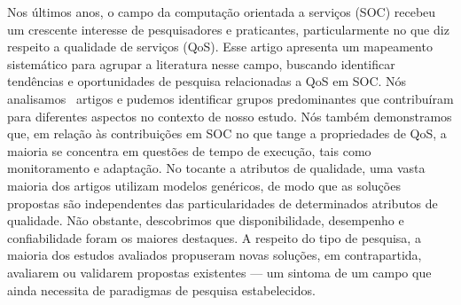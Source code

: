 \documentclass[conference]{IEEEtran}
\begin{document}
\begin{resumo}
  Nos \'{u}ltimos anos, o campo da computa\c{c}\~{a}o orientada a serviços (SOC) recebeu um crescente interesse de pesquisadores e praticantes, particularmente no que diz respeito a qualidade de servi\c{c}os (QoS). Esse artigo apresenta um mapeamento sistem\'{a}tico para agrupar a literatura nesse campo, buscando identificar tend\^{e}ncias e oportunidades de pesquisa relacionadas a QoS em SOC. N\'{o}s analisamos \AcceptedPubs~artigos e pudemos identificar grupos predominantes que contribu\'{i}ram para diferentes aspectos no contexto de nosso estudo. N\'{o}s tamb\'{e}m demonstramos que, em rela\c{c}\~{a}o \`{a}s contribui\c{c}\~{o}es em SOC no que tange a propriedades de QoS, a maioria se concentra em quest\~{o}es de tempo de execu\c{c}\~{a}o, tais como monitoramento e adapta\c{c}\~{a}o. No tocante a atributos de qualidade, uma vasta maioria dos artigos utilizam modelos gen\'{e}ricos, de modo que as solu\c{c}\~{o}es propostas s\~{a}o independentes das particularidades de determinados atributos de qualidade. N\~{a}o obstante, descobrimos que disponibilidade, desempenho e confiabilidade foram os maiores destaques. A respeito do tipo de pesquisa, a maioria dos estudos avaliados propuseram novas solu\c{c}\~{o}es, em contrapartida,  avaliarem ou validarem propostas existentes --- um sintoma de um campo que ainda necessita de paradigmas de pesquisa estabelecidos.
\end{resumo}



%
\IEEEpeerreviewmaketitle


    














\end{document}

